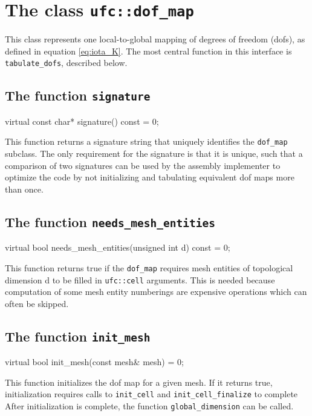 \section{The class \texttt{ufc::dof\_map}}

This class represents one local-to-global mapping of degrees of freedom (dofs),
as defined in equation \eqref{eq:iota_K}.
The most central function in this interface is \texttt{tabulate\_dofs}, described below.

\subsection{The function \texttt{signature}}

\begin{code}
virtual const char* signature() const = 0;
\end{code}

This function returns a signature string that uniquely identifies the \texttt{dof\_map} subclass.
The only requirement for the signature is that it is unique, such
that a comparison of two signatures can be used by the assembly
implementer to optimize the code by not initializing and tabulating equivalent dof maps more than once.

\subsection{The function \texttt{needs\_mesh\_entities}}

\begin{code}
virtual bool needs_mesh_entities(unsigned int d) const = 0;
\end{code}

This function returns true if the \texttt{dof\_map} requires mesh entities
of topological dimension d to be filled in \texttt{ufc::cell} arguments.
This is needed because computation of some mesh entity numberings
are expensive operations which can often be skipped.

\subsection{The function \texttt{init\_mesh}}

\begin{code}
virtual bool init_mesh(const mesh& mesh) = 0;
\end{code}

This function initializes the dof map for a given mesh.
If it returns true, initialization requires calls to \texttt{init\_cell} and \texttt{init\_cell\_finalize} to complete
After initialization is complete, the function \texttt{global\_dimension} can be called.

